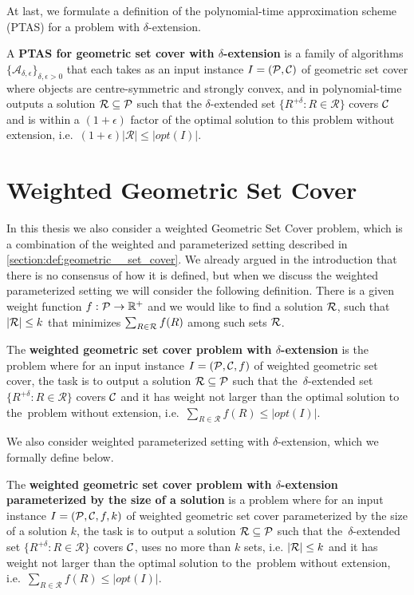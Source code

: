 At last, we formulate a definition of the
polynomial-time approximation scheme (PTAS)
for a problem with $\delta$-extension.

\begin{defi}
A \textbf{PTAS for geometric set cover 
with $\delta$-extension} is a family of algorithms
$\{\mathcal{A}_{\delta, \epsilon}\}_{\delta, \epsilon > 0}$ that
each takes as an input instance $I=(\mathcal{P}, \mathcal{C})$
of geometric set cover where objects are centre-symmetric and strongly convex,
and in polynomial-time outputs a solution $\mathcal{R} \subseteq \mathcal{P}$
such that the $\delta$-extended set
$\{ R^{+\delta} :  R \in \mathcal{R} \}$ covers $\mathcal{C}$
and is within a $(1+\epsilon)$ factor of the optimal
solution to this problem without
extension, i.e.~$(1+\epsilon)|\mathcal{R}| \le |opt(I)|$.
\end{defi}

\section{Weighted Geometric Set Cover}

In this thesis we also consider a weighted Geometric Set Cover problem,
which is a combination
of the weighted and parameterized setting described in 
\ref{section:def:geometric__set_cover}.
We already argued in the introduction
that there is no consensus of how it is defined, but when we discuss the
weighted parameterized setting we will consider the following
definition. There is a given weight function
$f : \mathcal{P} \rightarrow \mathbb{R^+}$
and we would like to find a solution $\mathcal{R}$,
such that $|\mathcal{R}| \le k$
that minimizes $\sum_{R \in \mathcal{R}} f(R)$ among such sets $\mathcal{R}$.

\begin{defi}
The \textbf{weighted geometric set cover problem
with $\delta$-extension} is the problem where for an input instance
$I=(\mathcal{P}, \mathcal{C}, f)$ of weighted geometric set cover,
the task is to output a solution $\mathcal{R} \subseteq \mathcal{P}$
such that the~$\delta$-extended set
$\{ R^{+\delta} :  R \in \mathcal{R} \}$ covers $\mathcal{C}$
and it has weight not larger than the optimal solution to the~problem without
extension, i.e.~$\sum_{R \in \mathcal{R}} f(R) \le |opt(I)|$.
\end{defi}

We also consider weighted parameterized setting with $\delta$-extension,
which we formally define below.

\begin{defi}
The \textbf{weighted geometric set cover problem
with $\delta$-extension parameterized by the size of a solution}
is a problem where for an input instance
${I=(\mathcal{P}, \mathcal{C}, f, k)}$ of weighted geometric set cover
parameterized by the size of a solution $k$,
the task is to output a solution $\mathcal{R} \subseteq \mathcal{P}$
such that the~$\delta$-extended set
$\{ R^{+\delta} :  R \in \mathcal{R} \}$ covers $\mathcal{C}$,
uses no more than $k$ sets, i.e. $|\mathcal{R}| \le k$
and it has weight not larger than the optimal solution to the~problem without
extension, i.e.~$\sum_{R \in \mathcal{R}} f(R) \le |opt(I)|$.
\end{defi}
